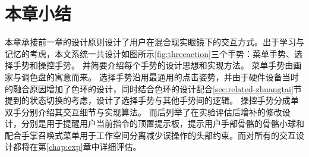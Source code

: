 \section{本章小结}
本章承接前一章的设计原则设计了用户在混合现实眼镜下的交互方式。出于学习与记忆的考虑，本文系统一共设计如图所示\ref{fig:threeaction}三个手势：菜单手势、选择手势和操控手势。
并简要介绍每个手势的设计思想和实现方法。
菜单手势由画家与调色盘的寓意而来。
选择手势沿用最通用的点击姿势，并由于硬件设备当时的融合原因增加了色环的设计，同时结合色环的设计配合\ref{sec:related-zhuangtai}节提到的状态切换的考虑，设计了选择手势与其他手势间的逻辑。
操控手势分成单双手分别介绍其交互细节与实现算法。
而后列举了在实验评估后增补的修改设计，分别是用于提醒用户当前指令的顶置提示板，提示用户手部骨骼的骨骼小球和配合手掌召唤式菜单用于工作空间分离减少误操作的头部约束。而对所有的交互设计都将在第\ref{chap:exp}章中详细评估。